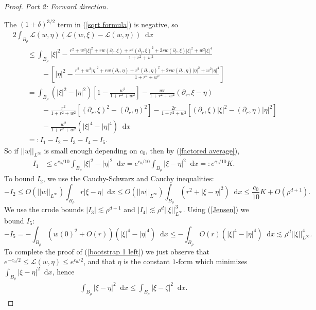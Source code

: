 \documentclass[reqno,10pt]{amsart}
\newcommand*\dif{\mathop{}\!\mathrm{d}}
\newcommand{\Lagrange}{\mathscr L}
\theoremstyle{definition}
\newcommand{\proofpart}[2]{%
  \par
  \addvspace{\medskipamount}%
  \noindent\emph{Part #1: #2.}
}
\numberwithin{equation}{section}
\begin{document}
\begin{proof}
\proofpart{2}{Forward direction}
The $(1 + \delta)^{3/2}$ term in (\ref{sqrt formula}) is negative, so 
\begin{align*}
&2\int_{B_\rho} \Lagrange(w, \eta)(\Lagrange(w, \xi) - \Lagrange(w, \eta)) \dif x\\ 
&\qquad \leq \int_{B_\rho} |\xi|^2 - \frac{r^2 + w^2 |\xi|^2 + rw (\partial_r, \xi) + r^2 (\partial_r, \xi)^2 + 2 rw (\partial_r, \xi) |\xi|^2 + w^2 |\xi|^4}{1 + r^2 + w^2} \\
&\qquad \qquad - \left[|\eta|^2 - \frac{r^2 + w^2 |\eta|^2 + rw (\partial_r, \eta) + r^2 (\partial_r, \eta)^2 + 2 rw (\partial_r, \eta) |\eta|^2 + w^2 |\eta|^4}{1 + r^2 + w^2}\right] \\
&\qquad = \int_{B_\rho} (|\xi|^2 - |\eta|^2)\left[1 - \frac{w^2}{1 + r^2 + w^2}\right] - \frac{wr}{1 + r^2 + w^2} (\partial_r, \xi - \eta) \\
&\qquad \qquad - \frac{r^2}{1 + r^2 + w^2} \left[(\partial_r, \xi)^2 - (\partial_r, \eta)^2\right] - \frac{2r}{1 + r^2 + w^2}\left[(\partial_r, \xi)|\xi|^2 - (\partial_r, \eta)|\eta|^2\right] \\
&\qquad \qquad - \frac{w^2}{1 + r^2 + w^2}(|\xi|^4 - |\eta|^4) \dif x\\
&\qquad =: I_1 - I_2 - I_3 - I_4 - I_5.
\end{align*}
So if $||w||_{L^\infty}$ is small enough depending on $c_0$, then by (\ref{factored average}),
\begin{align*}
I_1 &\leq e^{c_0/10} \int_{B_\rho} |\xi|^2 - |\eta|^2 \dif x = e^{c_0/10} \int_{B_\rho} |\xi - \eta|^2 \dif x =: e^{c_0/10} K.
\end{align*}
To bound $I_2$, we use the Cauchy-Schwarz and Cauchy inequalities:
$$-I_2 \leq O(||w||_{L^\infty}) \int_{B_\rho} r|\xi - \eta| \dif x \leq O(||w||_{L^\infty}) \int_{B_\rho} (r^2 + |\xi - \eta|^2) \dif x \leq \frac{c_0}{10} K + O(\rho^{d + 1}).$$
We use the crude bounds $|I_3| \lesssim \rho^{d + 1}$ and $|I_4| \lesssim \rho^d ||\xi||_{L^\infty}^3$.
Using (\ref{Jensen}) we bound $I_5$:
$$-I_5 = -\int_{B_\rho} (w(0)^2 + O(r))(|\xi|^4 - |\eta|^4) \dif x \leq -\int_{B_\rho} O(r)(|\xi|^4 - |\eta|^4) \dif x \lesssim \rho^d ||\xi||_{L^\infty}^4.$$
To complete the proof of (\ref{bootstrap 1 left}) we just observe that $e^{-c_0/2} \leq \Lagrange(w, \eta) \leq e^{c_0/2}$, and that $\eta$ is the constant $1$-form which minimizes $\int_{B_\rho} |\xi - \eta|^2 \dif x$, hence 
\begin{align*}
\int_{B_\rho} |\xi - \eta|^2 \dif x \leq \int_{B_\rho} |\xi - \zeta|^2 \dif x.
\end{align*}


\end{proof}
\end{document}
